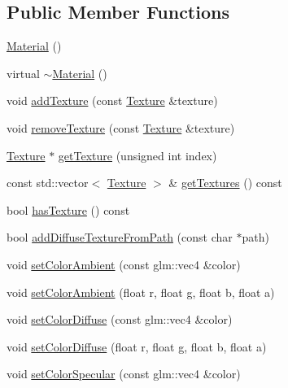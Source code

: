 \subsection*{Public Member Functions}
\begin{DoxyCompactItemize}
\item 
\mbox{\hyperlink{classec_1_1_material_a259d88ca352df2d284380f0b37052652}{Material}} ()
\item 
virtual \mbox{\hyperlink{classec_1_1_material_aec5bd3f3ef761f49a5028b415a9de52e}{$\sim$\+Material}} ()
\item 
void \mbox{\hyperlink{classec_1_1_material_aad92ada3fcc1f7b66e6bf3b6aeac73b8}{add\+Texture}} (const \mbox{\hyperlink{classec_1_1_texture}{Texture}} \&texture)
\item 
void \mbox{\hyperlink{classec_1_1_material_a83a673bcbcdef42bcea99939e5d6ff03}{remove\+Texture}} (const \mbox{\hyperlink{classec_1_1_texture}{Texture}} \&texture)
\item 
\mbox{\hyperlink{classec_1_1_texture}{Texture}} $\ast$ \mbox{\hyperlink{classec_1_1_material_a8679615f24284e809f213b882bec81bf}{get\+Texture}} (unsigned int index)
\item 
const std\+::vector$<$ \mbox{\hyperlink{classec_1_1_texture}{Texture}} $>$ \& \mbox{\hyperlink{classec_1_1_material_a95d74f12ec9d69a764a249e36b6b857c}{get\+Textures}} () const
\item 
bool \mbox{\hyperlink{classec_1_1_material_a961612ff2caee16d5d4b8f9b74042cf2}{has\+Texture}} () const
\item 
bool \mbox{\hyperlink{classec_1_1_material_a15b5c4adb903b16c25ad312963027924}{add\+Diffuse\+Texture\+From\+Path}} (const char $\ast$path)
\item 
void \mbox{\hyperlink{classec_1_1_material_afdd82441b5b2168161a17824e4a90f6f}{set\+Color\+Ambient}} (const glm\+::vec4 \&color)
\item 
void \mbox{\hyperlink{classec_1_1_material_a4ee41422a7625ac8a9f8a5e52bb18cf7}{set\+Color\+Ambient}} (float r, float g, float b, float a)
\item 
void \mbox{\hyperlink{classec_1_1_material_a22b711323a849e2ff6f9ffb871402a3e}{set\+Color\+Diffuse}} (const glm\+::vec4 \&color)
\item 
void \mbox{\hyperlink{classec_1_1_material_aa86e76b930ffffd45076465eff08bf27}{set\+Color\+Diffuse}} (float r, float g, float b, float a)
\item 
void \mbox{\hyperlink{classec_1_1_material_a947f0946ff806852e1733b1e95a03489}{set\+Color\+Specular}} (const glm\+::vec4 \&color)

\end{DoxyCompactItemize}
